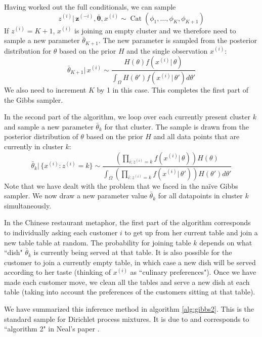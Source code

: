 \documentclass[final,3p,times,twocolumn]{elsarticle}
\DeclareMathOperator*{\Cat}{Cat}
\let\bs\boldsymbol
\begin{document}
Having worked out the full conditionals, we can sample 
\begin{equation}
\label{eqn:samplez}
z^{(i)}|\,\bs z^{(-i)},\overline {\bs \theta},x^{(i)} \sim \Cat(\phi_1,\dots,\phi_K,\phi_{K+1})
\end{equation}
If $z^{(i)}=K+1$, $x^{(i)}$ is joining an empty cluster and we therefore need to sample a new parameter $\bar \theta_{K+1}$.
The new parameter is sampled from the posterior distribution for $\theta$ based on the prior $H$ and the single observation $x^{(i)}$:
\begin{equation}
\label{eqn:newcluster}
\bar \theta_{K+1}|\,x^{(i)} \sim \frac{H(\theta)f(x^{(i)}|\,\theta)}{\int_\Omega H(\theta')f(x^{(i)}|\,\theta')d\theta'}
\end{equation}
We also need to increment $K$ by 1 in this case.
This completes the first part of the Gibbs sampler.

In the second part of the algorithm, we loop over each currently present cluster $k$ and sample a new parameter $\bar \theta_k$ for that cluster.
The sample is drawn from the posterior distribution of $\theta$ based on the prior $H$ and all data points that are currently in cluster $k$:
\begin{equation}
\label{eqn:sampletheta}
\bar \theta_k |\,\{x^{(i)}:z^{(i)}=k\} \sim \frac{\left(\prod_{i:z^{(i)}=k}f(x^{(i)}|\,\theta)\right)H(\theta)}{\int_\Omega\left(\prod_{i:z^{(i)}=k}f(x^{(i)}|\,\theta')\right)H(\theta')d\theta'}
\end{equation}
Note that we have dealt with the problem that we faced in the na{\"i}ve Gibbs sampler.
We now draw a new parameter value $\bar \theta_k$ for all datapoints in cluster $k$ simultaneously.

In the Chinese restaurant metaphor, the first part of the algorithm corresponds to individually asking each customer $i$ to get up from her current table and join a new table table at random.
The probability for joining table $k$ depends on what ``dish" $\bar \theta_k$ is currently being served at that table. It is also possible for the customer to join a currently empty table, in which case a new dish will be served according to her taste (thinking of $x^{(i)}$ as ``culinary preferences").
Once we have made each customer move, we clean all the tables and serve a new dish at each table (taking into account the preferences of the customers sitting at that table).

We have summarized this inference method in algorithm \ref{alg:gibbs2}.
This is the standard sample for Dirichlet process mixtures.
It is due to \cite{maceachern1994} and corresponds to ``algorithm 2" in Neal's paper \cite{neal2000}.
\end{document}
